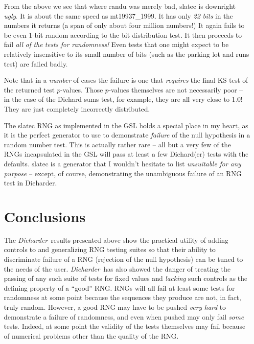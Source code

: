 \documentclass[12pt]{book}
\newcommand{\die}{\emph{Dieharder}\ }
\begin{document}
From the above we see that where randu was merely bad, slatec is
downright {\em ugly}.  It is about the same speed as mt19937\_1999.  It
has only {\em 22 bits} in the numbers it returns (a span of only about
four million numbers!)  It again fails to be even 1-bit random according
to the bit distribution test.  It then proceeds to fail {\em all of the
tests for randomness!} Even tests that one might expect to be relatively
insensitive to its small number of bits (such as the parking lot and
runs test) are failed badly.

Note that in a {\em number} of cases the failure is one that {\em
requires} the final KS test of the returned test $p$-values.  Those
$p$-values themselves are not necessarily poor -- in the case of the
Diehard sums test, for example, they are all very close to 1.0!  They
are just completely incorrectly distributed.

The slatec RNG as implemented in the GSL holds a special place in my
heart, as it is the perfect generator to use to demonstrate {\em
failure} of the null hypothesis in a random number test.  This is
actually rather rare -- all but a very few of the RNGs incapsulated in
the GSL will pass at least a few Diehard(er) tests with the defaults.
slatec is a generator that I wouldn't hesitate to list {\em unsuitable
for any purpose} -- except, of course, demonstrating the unambiguous
failure of an RNG test in Dieharder.

\chapter{Conclusions}

The \die results presented above show the practical utility of adding
controls to and generalizing RNG testing suites so that their ability to
discriminate failure of a RNG (rejection of the null hypothesis) can be
tuned to the needs of the user.  \die has also showed the danger of
treating the passing of any such suite of tests for fixed values and
{\em lacking} such controls as the defining property of a ``good'' RNG.
RNGs will all fail at least some tests for randomness at some point
because the sequences they produce are not, in fact, truly random.
However, a good RNG may have to be pushed {\em very hard} to demonstrate
a failure of randomness, and even when pushed may only fail {\em some}
tests.  Indeed, at some point the validity of the tests themselves may
fail because of numerical problems other than the quality of the RNG.
\end{document}
